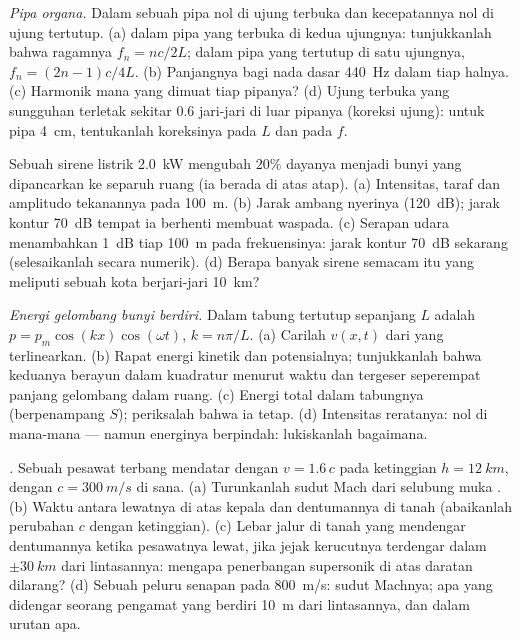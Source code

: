 \begin{exercise}[$\star\star$]\label{exo:b2:sound-waves:8}
\emph{Pipa organa.} Dalam sebuah pipa  nol di ujung terbuka
dan kecepatannya nol di ujung tertutup. (a)  dalam pipa
yang terbuka di kedua ujungnya: tunjukkanlah bahwa ragamnya $f_n = nc/2L$; dalam pipa yang tertutup di
satu ujungnya, $f_n = (2n - 1)c/4L$. (b) Panjangnya bagi nada dasar \qty{440}{Hz}
dalam tiap halnya. (c) Harmonik mana yang dimuat tiap pipanya? (d) Ujung
terbuka yang sungguhan terletak sekitar $0.6$ jari-jari di luar pipanya (koreksi ujung): untuk
pipa \qty{4}{cm}, tentukanlah koreksinya pada $L$ dan pada $f$.
\end{exercise}

\begin{exercise}[$\star\star$]\label{exo:b2:sound-waves:9}
Sebuah sirene listrik \qty{2.0}{kW} mengubah $20\%$ dayanya menjadi bunyi
yang dipancarkan ke separuh ruang (ia berada di atas atap). (a) Intensitas, taraf
dan amplitudo tekanannya pada \qty{100}{m}. (b) Jarak ambang nyerinya
(\qty{120}{dB}); jarak kontur \qty{70}{dB} tempat ia berhenti membuat waspada.
(c) Serapan udara menambahkan \qty{1}{dB} tiap \qty{100}{m} pada frekuensinya:
jarak kontur \qty{70}{dB} sekarang (selesaikanlah secara numerik). (d) Berapa banyak
sirene semacam itu yang meliputi sebuah kota berjari-jari \qty{10}{km}?
\end{exercise}

\begin{exercise}[$\star\star\star$]\label{exo:b2:sound-waves:10}
\emph{Energi gelombang bunyi berdiri.} Dalam tabung tertutup sepanjang $L$
 adalah $p = p_m\cos(kx)\cos(\omega t)$, $k = n\pi/L$. (a) Carilah $v(x,
t)$ dari  yang terlinearkan. (b) Rapat energi kinetik dan
potensialnya; tunjukkanlah bahwa keduanya berayun dalam kuadratur menurut waktu dan
tergeser seperempat panjang gelombang dalam ruang. (c) Energi total dalam
tabungnya (berpenampang $S$); periksalah bahwa ia tetap. (d) Intensitas reratanya: nol
di mana-mana --- namun energinya berpindah: lukiskanlah bagaimana.
\end{exercise}

\begin{exercise}[$\star\star\star$]\label{exo:b2:sound-waves:11}
\emph{.} Sebuah pesawat terbang mendatar dengan $v = 1.6\,c$ pada
ketinggian $h = \qty{12}{km}$, dengan $c = \qty{300}{m/s}$ di sana. (a) Turunkanlah sudut
Mach dari selubung muka . (b) Waktu antara
lewatnya di atas kepala dan dentumannya di tanah (abaikanlah perubahan
$c$ dengan ketinggian). (c) Lebar jalur di tanah yang mendengar
dentumannya ketika pesawatnya lewat, jika jejak kerucutnya terdengar dalam
$\pm\qty{30}{km}$ dari lintasannya: mengapa penerbangan supersonik di atas daratan
dilarang? (d) Sebuah peluru senapan pada \qty{800}{m/s}: sudut Machnya; apa yang didengar seorang pengamat
yang berdiri \qty{10}{m} dari lintasannya, dan dalam urutan apa.
\end{exercise}

